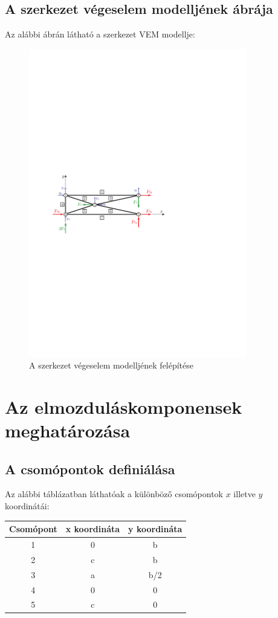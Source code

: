 \documentclass[12pt,a4paper]{article}
\begin{document}
\subsection{A szerkezet végeselem modelljének ábrája}
Az alábbi ábrán látható a szerkezet VEM modellje:
\begin{figure}[H]
    \centering
    \includegraphics[width=0.85\textwidth]{vszhf1_abra2.pdf}
    \caption{A szerkezet végeselem modelljének felépítése}
\end{figure}
\section{Az elmozduláskomponensek meghatározása}
\subsection{A csomópontok definiálása}
Az alábbi táblázatban láthatóak a különböző csomópontok $x$ illetve
$y$ koordinátái:
\begin{center}
    \begin{tabular}{|c|c|c|}
        \hline
        Csomópont & x koordináta & y koordináta \\
        \hline
        \hline
        1         & 0            & b            \\
        \hline
        2         & c            & b            \\
        \hline
        3         & a            & b/2          \\
        \hline
        4         & 0            & 0            \\
        \hline
        5         & c            & 0            \\
        \hline
    \end{tabular}
\end{center}
\end{document}
